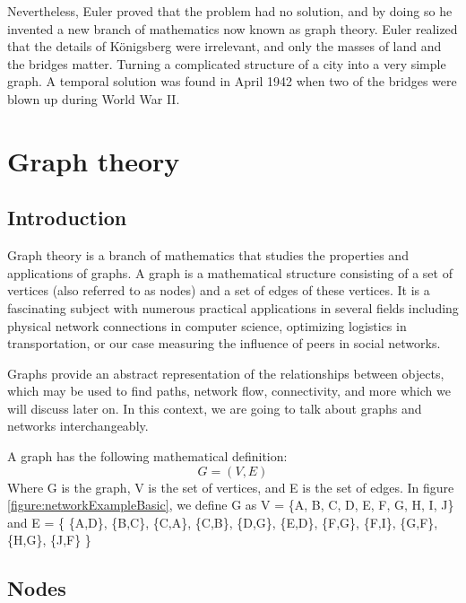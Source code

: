 Nevertheless, Euler proved that the problem had no solution, and by doing so he invented a new branch of mathematics now known as graph theory. Euler realized that the details of Königsberg were irrelevant, and only the masses of land and the bridges matter. Turning a complicated structure of a city into a very simple graph. A temporal solution was found in April 1942 when two of the bridges were blown up during World War II.



\section{Graph theory}

\subsection{Introduction}

Graph theory is a branch of mathematics that studies the properties and applications of graphs. A graph is a mathematical structure consisting of a set of vertices (also referred to as nodes) and a set of edges of these vertices. It is a fascinating subject with numerous practical applications in several fields including physical network connections in computer science, optimizing logistics in transportation, or our case measuring the influence of peers in social networks.

\clearpage

Graphs provide an abstract representation of the relationships between objects, which may be used to find paths, network flow, connectivity, and more which we will discuss later on. In this context, we are going to talk about graphs and networks interchangeably. 

A graph has the following mathematical definition: \label{eq:graph}
    \begin{equation}
        G = (V,E) 
    \end{equation}
Where G is the graph, V is the set of vertices, and E is the set of edges. In figure \ref{figure:networkExampleBasic}, we define G as V = \{A, B, C, D, E, F, G, H, I, J\} and E = \{ \{A,D\}, \{B,C\}, \{C,A\}, \{C,B\}, \{D,G\}, \{E,D\}, \{F,G\}, \{F,I\}, \{G,F\}, \{H,G\}, \{J,F\} \}

\subsection{ Nodes }

